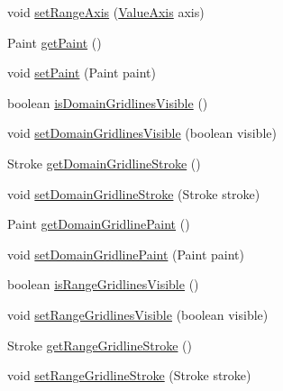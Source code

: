 \begin{DoxyCompactItemize}
void \mbox{\hyperlink{classorg_1_1jfree_1_1chart_1_1plot_1_1_fast_scatter_plot_a29f894e023c3c7b2b34baedf7db61127}{set\+Range\+Axis}} (\mbox{\hyperlink{classorg_1_1jfree_1_1chart_1_1axis_1_1_value_axis}{Value\+Axis}} axis)
\item 
Paint \mbox{\hyperlink{classorg_1_1jfree_1_1chart_1_1plot_1_1_fast_scatter_plot_ab465594de61ac0750f08993b2a8d30d9}{get\+Paint}} ()
\item 
void \mbox{\hyperlink{classorg_1_1jfree_1_1chart_1_1plot_1_1_fast_scatter_plot_ac6e77b9dddd49efb9053352792c606fe}{set\+Paint}} (Paint paint)
\item 
boolean \mbox{\hyperlink{classorg_1_1jfree_1_1chart_1_1plot_1_1_fast_scatter_plot_a17ba5d81c14e9d1c1bf4c26e14cdcbaa}{is\+Domain\+Gridlines\+Visible}} ()
\item 
void \mbox{\hyperlink{classorg_1_1jfree_1_1chart_1_1plot_1_1_fast_scatter_plot_ac18fa3c1d2d933d3057a756e823f6d50}{set\+Domain\+Gridlines\+Visible}} (boolean visible)
\item 
Stroke \mbox{\hyperlink{classorg_1_1jfree_1_1chart_1_1plot_1_1_fast_scatter_plot_ab2565956fc394a1587e83ce684bdad97}{get\+Domain\+Gridline\+Stroke}} ()
\item 
void \mbox{\hyperlink{classorg_1_1jfree_1_1chart_1_1plot_1_1_fast_scatter_plot_afdbb5ad6859e7e0319b781713845e104}{set\+Domain\+Gridline\+Stroke}} (Stroke stroke)
\item 
Paint \mbox{\hyperlink{classorg_1_1jfree_1_1chart_1_1plot_1_1_fast_scatter_plot_a7b1602a024385bab17b05b27b0f55cda}{get\+Domain\+Gridline\+Paint}} ()
\item 
void \mbox{\hyperlink{classorg_1_1jfree_1_1chart_1_1plot_1_1_fast_scatter_plot_af49e6d29cc7cc60458d27ace835c238d}{set\+Domain\+Gridline\+Paint}} (Paint paint)
\item 
boolean \mbox{\hyperlink{classorg_1_1jfree_1_1chart_1_1plot_1_1_fast_scatter_plot_a1d16d8a7ba258ba24a2eb4806b89884f}{is\+Range\+Gridlines\+Visible}} ()
\item 
void \mbox{\hyperlink{classorg_1_1jfree_1_1chart_1_1plot_1_1_fast_scatter_plot_a4c138745182ea476a64eacb632b5af6c}{set\+Range\+Gridlines\+Visible}} (boolean visible)
\item 
Stroke \mbox{\hyperlink{classorg_1_1jfree_1_1chart_1_1plot_1_1_fast_scatter_plot_a4c4cc7c68b1bf7c7396d3d7cd8aff979}{get\+Range\+Gridline\+Stroke}} ()
\item 
void \mbox{\hyperlink{classorg_1_1jfree_1_1chart_1_1plot_1_1_fast_scatter_plot_ac3387d82602cc9d59ecf2407b624045f}{set\+Range\+Gridline\+Stroke}} (Stroke stroke)

\end{DoxyCompactItemize}

